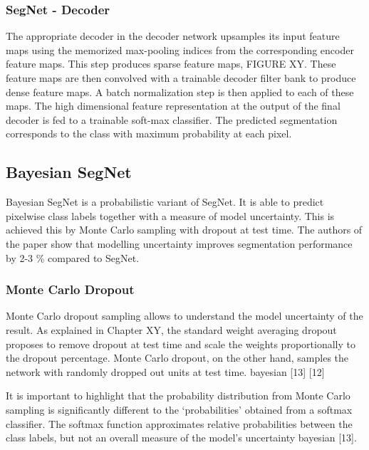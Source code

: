 \subsubsection{SegNet - Decoder}

The appropriate decoder in the decoder network upsamples its input feature maps using the memorized max-pooling indices from the corresponding encoder feature maps. This step produces sparse feature maps, FIGURE XY. These feature maps are then convolved with a trainable decoder filter bank to produce dense feature maps. A batch normalization step is then applied to each of these maps. The high dimensional feature representation at the output of the final decoder is fed to a trainable soft-max classifier. The predicted segmentation corresponds to the class with maximum probability at each pixel.

\subsection{Bayesian SegNet}

Bayesian SegNet is a probabilistic variant of SegNet. It is able to predict pixelwise class labels together with a measure of model uncertainty.  This is achieved this by Monte Carlo sampling with dropout at test time. The authors of the paper show that modelling uncertainty improves segmentation performance by 2-3 \% compared to SegNet.

\subsubsection{Monte Carlo Dropout}

Monte Carlo dropout sampling allows to understand the model uncertainty of the result. As explained in Chapter XY, the standard weight averaging dropout proposes to remove dropout at test time and scale the weights proportionally to the dropout percentage. Monte Carlo dropout, on the other hand, samples the network with randomly dropped out units at test time. bayesian [13] [12]

It is important to highlight that the probability distribution from Monte Carlo sampling is significantly different to the ‘probabilities’ obtained from a softmax classifier. The softmax function approximates relative probabilities between the class labels, but not an overall measure of the model’s uncertainty bayesian [13].





